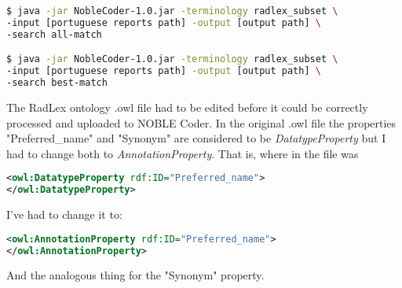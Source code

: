 \begin{lstlisting}[language=bash]
$ java -jar NobleCoder-1.0.jar -terminology radlex_subset \
-input [portuguese reports path] -output [output path] \
-search all-match

$ java -jar NobleCoder-1.0.jar -terminology radlex_subset \
-input [portuguese reports path] -output [output path] \
-search best-match
\end{lstlisting}


The RadLex ontology .owl file had to be edited before it could be correctly processed and uploaded to NOBLE Coder. In the original .owl file the properties  "Preferred\_name" and "Synonym" are considered to be \textit{DatatypeProperty} but I had to change both to \textit{AnnotationProperty}. That is, where in the file was


\begin{lstlisting}[language=xml]
<owl:DatatypeProperty rdf:ID="Preferred_name">
</owl:DatatypeProperty>
\end{lstlisting}


I've had to change it to:


\begin{lstlisting}[language=xml]
<owl:AnnotationProperty rdf:ID="Preferred_name">
</owl:AnnotationProperty>
\end{lstlisting}


And the analogous thing for the "Synonym" property.




 